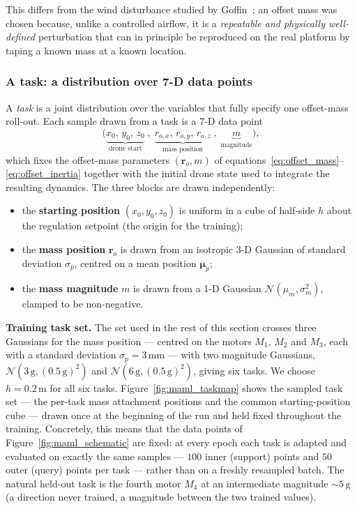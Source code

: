 \documentclass[11pt,a4paper]{article}
\theoremstyle{remark}
\numberwithin{equation}{section}
\begin{document}
This differs from the wind disturbance studied by Goffin~\cite{goffin2026};
an offset mass was chosen because, unlike a controlled airflow, it is a
\emph{repeatable and physically well-defined} perturbation that can in
principle be reproduced on the real platform by taping a known mass at a
known location.

\subsubsection*{A task: a distribution over 7-D data points}

A \emph{task} is a joint distribution over the variables that fully specify
one offset-mass roll-out. Each sample drawn from a task is a 7-D data point
\[
    \bigl(\underbrace{x_0,\, y_0,\, z_0}_{\text{drone start}}\;,\;
          \underbrace{r_{o,x},\, r_{o,y},\, r_{o,z}}_{\text{mass position}}\;,\;
          \underbrace{m}_{\text{magnitude}}\bigr),
\]
which fixes the offset-mass parameters $(\mathbf{r}_o, m)$ of
equations~\eqref{eq:offset_mass}--\eqref{eq:offset_inertia} together with the
initial drone state used to integrate the resulting dynamics. The three
blocks are drawn independently:
\begin{itemize}\itemsep1pt
    \item the \textbf{starting position} $(x_0, y_0, z_0)$ is uniform in a
    cube of half-side $h$ about the regulation setpoint (the origin for the training);
    \item the \textbf{mass position} $\mathbf{r}_o$ is drawn from an
    isotropic 3-D Gaussian of standard deviation $\sigma_p$, centred on a
    mean position $\boldsymbol{\mu}_p$;
    \item the \textbf{mass magnitude} $m$ is drawn from a 1-D Gaussian
    $\mathcal{N}(\mu_m, \sigma_m^2)$, clamped to be non-negative.
\end{itemize}

\textbf{Training task set.} The set used in the rest of this section crosses
three Gaussians for the mass position --- centred on the motors $M_1$, $M_2$
and $M_3$, each with a standard deviation $\sigma_p = 3\,\mathrm{mm}$ ---
with two magnitude Gaussians, $\mathcal{N}(3\,\mathrm{g}, (0.5\,\mathrm{g})^2)$
and $\mathcal{N}(6\,\mathrm{g}, (0.5\,\mathrm{g})^2)$, giving six tasks. We choose $h = 0.2\,\mathrm{m}$ for all six tasks.
Figure~\ref{fig:maml_taskmap} shows the
sampled task set --- the per-task mass attachment positions and the common
starting-position cube --- drawn once at the beginning of the run and held
fixed throughout the training. Concretely, this means that the data points of
Figure~\ref{fig:maml_schematic} are fixed: at every epoch each task is adapted and
evaluated on exactly the same samples --- $100$ inner (support) points and $50$
outer (query) points per task --- rather than on a freshly resampled batch. The
natural held-out task is the
fourth motor $M_4$ at an intermediate magnitude $\sim\!5\,\mathrm{g}$
(a direction never trained, a magnitude between the two trained values).
\end{document}
